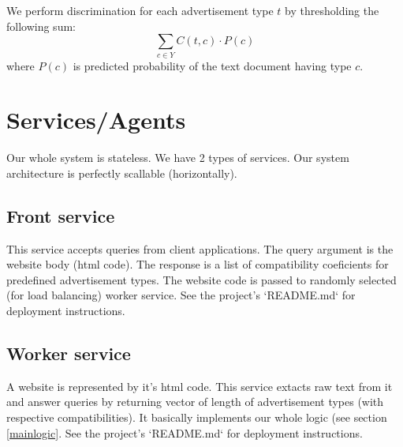 \documentclass[a4paper]{article}
\begin{document}
We perform discrimination for each advertisement type $t$
by thresholding the following sum:
\begin{equation}
    \sum_{c\in{Y}} {C(t, c) \cdot P(c)}
\end{equation}
where $P(c)$ is predicted probability of the text document having type $c$.



\section{Services/Agents}
Our whole system is stateless.
We have 2 types of services.
Our system architecture is perfectly scallable (horizontally).

\subsection{Front service}

This service accepts queries from client applications.
The query argument is the website body (html code).
The response is a list of compatibility coeficients for predefined advertisement types.
The website code is passed to randomly selected (for load balancing) worker service.
See the project's `README.md` for deployment instructions.


\subsection{Worker service}
A website is represented by it's html code.
This service extacts raw text from it and answer queries by returning vector of length of advertisement types
(with respective compatibilities).
It basically implements our whole logic (see section \ref{mainlogic}.
See the project's `README.md` for deployment instructions.
\end{document}
